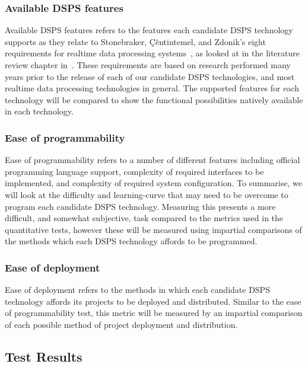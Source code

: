 \subsubsection{Available DSPS features}

Available DSPS features refers to the features each candidate DSPS technology supports as they relate to Stonebraker,
\c{C}\~entintemel, and Zdonik's eight requirements for realtime data processing systems~\cite{stonebraker_8_2005}, as looked at
in the literature review chapter in~. These requirements are based on research performed
many years prior to the release of each of our candidate DSPS technologies, and most realtime data processing technologies
in general. The supported features for each technology will be compared to show the functional possibilities natively
available in each technology.

\subsubsection{Ease of programmability}

Ease of programmability refers to a number of different features including official programming language support, complexity
of required interfaces to be implemented, and complexity of required system configuration. To summarise, we will look at
the difficulty and learning-curve that may need to be overcome to program each candidate DSPS technology. Measuring this
presents a more difficult, and somewhat subjective, task compared to the metrics used in the quantitative tests, however
these will be measured using impartial comparisons of the methods which each DSPS technology affords to be programmed.

\subsubsection{Ease of deployment}

Ease of deployment refers to the methods in which each candidate DSPS technology affords its projects to be deployed and distributed.
Similar to the ease of programmability test, this metric will be measured by an impartial comparison of each possible
method of project deployment and distribution.



\subsection{Test Results} %
\label{ssub:qual_test_results}

